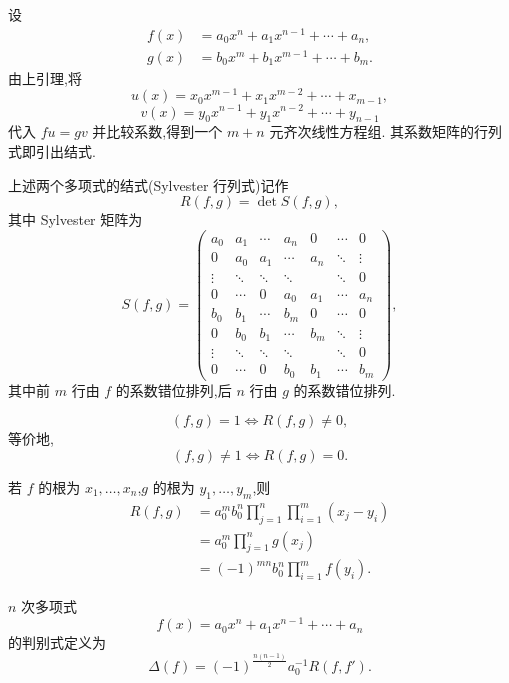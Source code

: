 设
\[
\begin{aligned}
  f(x)&=a_0x^n+a_1x^{n-1}+\cdots+a_n,\\
  g(x)&=b_0x^m+b_1x^{m-1}+\cdots+b_m.
\end{aligned}
\]
由上引理,将
\[
  u(x)=x_0x^{m-1}+x_1x^{m-2}+\cdots+x_{m-1},
\]
\[
  v(x)=y_0x^{n-1}+y_1x^{n-2}+\cdots+y_{n-1}
\]
代入 $fu=gv$ 并比较系数,得到一个 $m+n$ 元齐次线性方程组.
其系数矩阵的行列式即引出结式.

\begin{definition}
上述两个多项式的结式(Sylvester 行列式)记作
\[
  R(f,g)=\det S(f,g),
\]
其中 Sylvester 矩阵为
\[
S(f,g)=
\begin{pmatrix}
 a_0&a_1&\cdots&a_n&0&\cdots&0\\
 0&a_0&a_1&\cdots&a_n&\ddots&\vdots\\
 \vdots&\ddots&\ddots&\ddots&&\ddots&0\\
 0&\cdots&0&a_0&a_1&\cdots&a_n\\
 b_0&b_1&\cdots&b_m&0&\cdots&0\\
 0&b_0&b_1&\cdots&b_m&\ddots&\vdots\\
 \vdots&\ddots&\ddots&\ddots&&\ddots&0\\
 0&\cdots&0&b_0&b_1&\cdots&b_m
\end{pmatrix},
\]
其中前 $m$ 行由 $f$ 的系数错位排列,后 $n$ 行由 $g$ 的系数错位排列.
\end{definition}

\begin{theorem}[\markstar]
\[
  (f,g)=1\iff R(f,g)\ne0,
\]
等价地,
\[
  (f,g)\ne1\iff R(f,g)=0.
\]
\end{theorem}

\begin{theorem}[\markstar]
若 $f$ 的根为 $x_1,\ldots,x_n$,$g$ 的根为 $y_1,\ldots,y_m$,则
\[
\begin{aligned}
  R(f,g)
  &=a_0^m b_0^n
    \prod\limits_{j=1}^{n}\prod\limits_{i=1}^{m}(x_j-y_i)\\
  &=a_0^m\prod\limits_{j=1}^{n}g(x_j)\\
  &=(-1)^{mn}b_0^n\prod\limits_{i=1}^{m}f(y_i).
\end{aligned}
\]
\end{theorem}

\begin{definition}
$n$ 次多项式
\[
  f(x)=a_0x^n+a_1x^{n-1}+\cdots+a_n
\]
的判别式定义为
\[
  \Delta(f)
  =(-1)^{\frac{n(n-1)}2}a_0^{-1}R(f,f').
\]
\end{definition}


